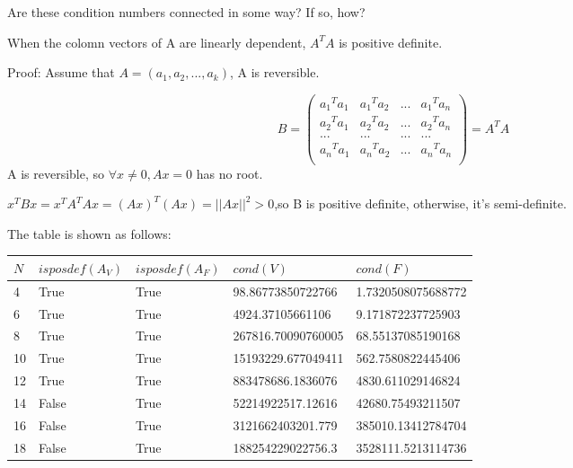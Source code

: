 \documentclass[10pt]{article}
\begin{document}
\begin{enumerate}[label=3.\arabic*]
    Are these condition numbers connected in some way? If so, how?\par
    	When the colomn vectors of A are linearly dependent, $A^TA$ is positive definite.\par
    Proof: Assume that $A=(a_1,a_2,...,a_k)$, A is reversible.\par
    \begin{equation}       %
    B=\left(                 %
    \begin{array}{cccc}   %
    {a_1}^Ta_1 & {a_1}^Ta_2&... & {a_1}^Ta_n\\  %
    {a_2}^Ta_1 & {a_2}^Ta_2&... & {a_2}^Ta_n\\  %
    ... & ...&... & ...\\  %
    {a_n}^Ta_1 & {a_n}^Ta_2&... & {a_n}^Ta_n\\  %
    \end{array}
    \right)=A^TA                 %
    \end{equation}
    A is reversible, so $\forall x\neq0,Ax=0$ has no root.\par
    $x^TBx=x^TA^TAx=(Ax)^T(Ax)=||Ax||^2>0$,so B is positive definite, otherwise, it's semi-definite.\par
    The table is shown as follows:\par
    \begin{table}[H]
    	\centering
    	\begin{tabular}{|l|l|l|l|l|}
    		\hline
    		$N$& $isposdef(A_V)$ &$isposdef(A_F)$  &$cond(V)$  &$cond(F)$  \\ \hline
    4  & True  & True  & 98.86773850722766      & 1.7320508075688772 \\ \hline
    6  & True  & True  & 4924.37105661106       & 9.171872237725903  \\ \hline
    8  & True  & True  & 267816.70090760005     & 68.55137085190168  \\ \hline
    10 & True  & True  & 15193229.677049411     & 562.7580822445406  \\ \hline
    12 & True  & True  & 883478686.1836076      & 4830.611029146824  \\ \hline
    14 & False & True  & 52214922517.12616      & 42680.75493211507  \\ \hline
    16 & False & True  & 3121662403201.779      & 385010.13412784704 \\ \hline
    18 & False & True  & 188254229022756.3      & 3528111.5213114736 \\ \hline

\end{tabular}
\end{table}
\end{enumerate}
\end{document}
